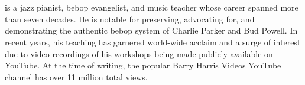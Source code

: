 \section{\BarryFull}

\BarryFormal is a jazz pianist, bebop evangelist, and music teacher whose career spanned more than seven decades. He is notable for preserving, advocating for, and demonstrating the authentic bebop system of Charlie Parker and Bud Powell. In recent years, his teaching has garnered world-wide acclaim and a surge of interest due to video recordings of his workshops being made publicly available on YouTube. At the time of writing, the popular Barry Harris Videos YouTube channel has over 11 million total views.
